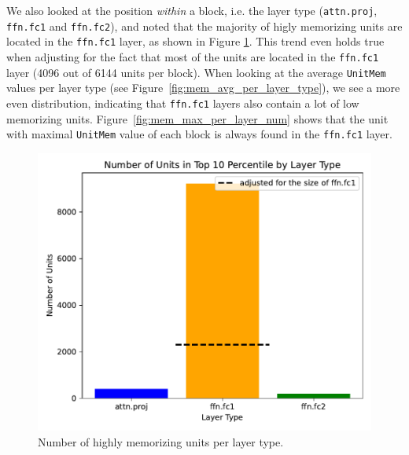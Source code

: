 \documentclass{article} %
\begin{document}
We also looked at the position \textit{within} a block, i.e. the layer type (\texttt{attn.proj}, \texttt{ffn.fc1} and \texttt{ffn.fc2}), and noted that the majority of higly memorizing units are located in the \texttt{ffn.fc1} layer, as shown in Figure \ref{fig:mem_units_per_layer_type}.
This trend even holds true when adjusting for the fact that most of the units are located in the \texttt{ffn.fc1} layer (4096 out of 6144 units per block).
When looking at the average \texttt{UnitMem} values per layer type (see Figure~\ref{fig:mem_avg_per_layer_type}), we see a more even distribution, indicating that \texttt{ffn.fc1} layers also contain a lot of low memorizing units.
Figure~\ref{fig:mem_max_per_layer_num} shows that the unit with maximal \texttt{UnitMem} value of each block is always found in the \texttt{ffn.fc1} layer.
\begin{figure}[ht]
   \centering
   \begin{minipage}{0.48\textwidth}
      \centering
      \includegraphics[width=\textwidth]{figures/mem_units_per_layer_type.pdf}
      \caption{Number of highly memorizing units per layer type.}
      \label{fig:mem_units_per_layer_type}
   \end{minipage}\hfill
   \begin{minipage}{0.48\textwidth}
      \centering

\end{minipage}
\end{figure}
\end{document}
